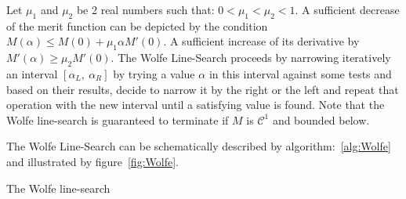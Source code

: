 

Let $\mu_1$ and $\mu_2$ be 2 real numbers such that: $0<\mu_1<\mu_2<1$.
A sufficient decrease of the merit function can be depicted by the condition $M(\alpha) \leq M(0) + \mu_1 \alpha M'(0)$.
A sufficient increase of its derivative by $M'(\alpha)\geq\mu_2 M'(0)$.
The Wolfe Line-Search proceeds by narrowing iteratively an interval $[\alpha_L,\ \alpha_R]$ by trying a value $\alpha$ in this interval against some tests and based on their results, decide to narrow it by the right or the left and repeat that operation with the new interval until a satisfying value is found.
Note that the Wolfe line-search is guaranteed to terminate if $M$ is $\mathcal{C}^1$ and bounded below.

The Wolfe Line-Search can be schematically described by algorithm:~\ref{alg:Wolfe} and illustrated by figure~\ref{fig:Wolfe}.

\begin{algorithm}
\begin{algorithmic}
  \EndLoop{}
  \caption{The Wolfe line-search}
\label{alg:Wolfe}
\end{algorithmic}
\end{algorithm}

